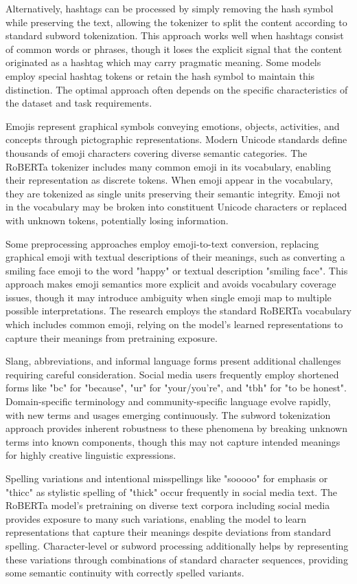 \documentclass[12pt,a4paper]{report}
\begin{document}
Alternatively, hashtags can be processed by simply removing the hash symbol while preserving the text, allowing the tokenizer to split the content according to standard subword tokenization. This approach works well when hashtags consist of common words or phrases, though it loses the explicit signal that the content originated as a hashtag which may carry pragmatic meaning. Some models employ special hashtag tokens or retain the hash symbol to maintain this distinction. The optimal approach often depends on the specific characteristics of the dataset and task requirements.

Emojis represent graphical symbols conveying emotions, objects, activities, and concepts through pictographic representations. Modern Unicode standards define thousands of emoji characters covering diverse semantic categories. The RoBERTa tokenizer includes many common emoji in its vocabulary, enabling their representation as discrete tokens. When emoji appear in the vocabulary, they are tokenized as single units preserving their semantic integrity. Emoji not in the vocabulary may be broken into constituent Unicode characters or replaced with unknown tokens, potentially losing information.

Some preprocessing approaches employ emoji-to-text conversion, replacing graphical emoji with textual descriptions of their meanings, such as converting a smiling face emoji to the word "happy" or textual description "smiling face". This approach makes emoji semantics more explicit and avoids vocabulary coverage issues, though it may introduce ambiguity when single emoji map to multiple possible interpretations. The research employs the standard RoBERTa vocabulary which includes common emoji, relying on the model's learned representations to capture their meanings from pretraining exposure.

Slang, abbreviations, and informal language forms present additional challenges requiring careful consideration. Social media users frequently employ shortened forms like "bc" for "because", "ur" for "your/you're", and "tbh" for "to be honest". Domain-specific terminology and community-specific language evolve rapidly, with new terms and usages emerging continuously. The subword tokenization approach provides inherent robustness to these phenomena by breaking unknown terms into known components, though this may not capture intended meanings for highly creative linguistic expressions.

Spelling variations and intentional misspellings like "sooooo" for emphasis or "thicc" as stylistic spelling of "thick" occur frequently in social media text. The RoBERTa model's pretraining on diverse text corpora including social media provides exposure to many such variations, enabling the model to learn representations that capture their meanings despite deviations from standard spelling. Character-level or subword processing additionally helps by representing these variations through combinations of standard character sequences, providing some semantic continuity with correctly spelled variants.
\end{document}
